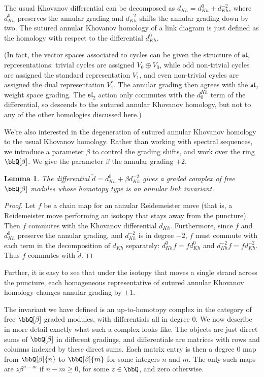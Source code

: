 \documentclass{amsart}
\theoremstyle{plain}
\newtheorem{lem}[prop]{Lemma}
\newcommand{\fsl}{\mathfrak{sl}_2}
\begin{document}
The usual Khovanov differential can be decomposed as $d_{Kh}=d_{Kh}^0+d_{Kh}^{-2}$, where $d_{Kh}^0$ preserves the annular grading and $d_{Kh}^{-2}$ shifts the annular grading down by two. The  sutured annular Khovanov homology of a link diagram is just defined as the homology with respect to the differential $d_{Kh}^0$.

(In fact, the vector spaces associated to cycles can be given the structure of $\fsl$ representations: trivial cycles are assigned $V_0 \oplus V_0$, while odd non-trivial cycles are assigned the standard representation $V_1$, and even non-trivial cycles are assigned the dual representation $V_1^*$. The annular grading then agrees with the $\fsl$ weight space grading. The $\fsl$ action only commutes with the $d^{Kh}_0$ term of the differential, so descends to the sutured annular Khovanov homology, but not to any of the other homologies discussed here.)

We're also interested in the degeneration of sutured annular Khovanov homology to the usual Khovanov homology. Rather than working with spectral sequences, we introduce a parameter $\beta$ to control the grading shifts, and work over the ring $\bbQ[\beta]$. We give the parameter $\beta$ the annular grading $+2$. 

\begin{lem}
The differential $\tilde{d}=d_{Kh}^0 + \beta d_{Kh}^{-2}$ gives a graded complex of free $\bbQ[\beta]$ modules whose homotopy type is an annular link invariant.
\end{lem}

\begin{proof}
Let $f$ be a chain map for an annular Reidemeister move (that is, a Reidemeister move performing an isotopy that stays away from the puncture).  Then $f$ commutes with the Khovanov differential $d_{Kh}$.  Furthermore, since $f$ and $d_{Kh}^0$ preserve the annular grading, and $d_{Kh}^{-2}$ is in degree $-2$, $f$ must commute with each term in the decomposition of $d_{Kh}$ separately: $d_{Kh}^0 f= f d_{Kh}^0$ and $d_{Kh}^{-2} f = f d_{Kh}^{-2}$.  Thus $f$ commutes with $\tilde{d}$.
\end{proof}

Further, it is easy to see that under the isotopy that moves a single strand across the puncture, each homogeneous representative of sutured annular Khovanov homology changes annular grading by $\pm 1$.

The invariant we have defined is an up-to-homotopy complex in the category of free $\bbQ[\beta]$ graded modules, with differentials all in degree 0. We now describe in more detail exactly what such a complex looks like.
The objects are just direct sums of $\bbQ[\beta]$ in different gradings, and differentials are matrices with rows and columns indexed by these direct sums. Each matrix entry is then a degree 0 map from $\bbQ[\beta]\{n\}$ to $\bbQ[\beta]\{m\}$ for some integers $n$ and $m$. The only such maps are $z \beta^{n-m}$ if $n-m \geq 0$, for some $z \in \bbQ$, and zero otherwise.
\end{document}
